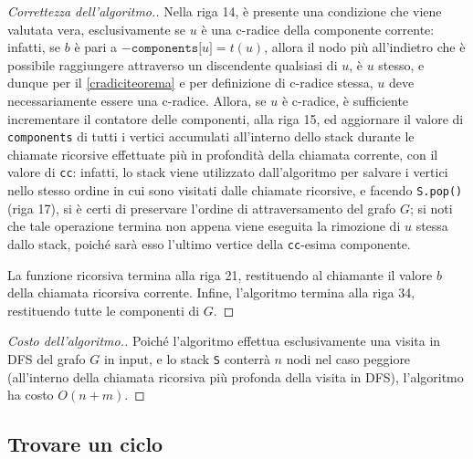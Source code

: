 \documentclass[a4paper, 12pt]{report}
\begin{document}
\begin{proof}[Correttezza dell'algoritmo.]
        Nella riga 14, è presente una condizione che viene valutata vera, esclusivamente se $u$ è una c-radice della componente corrente: infatti, se $b$ è pari a $-\texttt{components[}u\texttt{]} = t(u)$, allora il nodo più all'indietro che è possibile raggiungere attraverso un discendente qualsiasi di $u$, è $u$ stesso, e dunque per il \cref{cradiciteorema} e per definizione di c-radice stessa, $u$ deve necessariamente essere una c-radice. Allora, se $u$ è c-radice, è sufficiente incrementare il contatore delle componenti, alla riga 15, ed aggiornare il valore di \texttt{components} di tutti i vertici accumulati all'interno dello stack durante le chiamate ricorsive effettuate più in profondità della chiamata corrente, con il valore di \texttt{cc}: infatti, lo stack viene utilizzato dall'algoritmo per salvare i vertici nello stesso ordine in cui sono visitati dalle chiamate ricorsive, e facendo \texttt{S.pop()} (riga 17), si è certi di preservare l'ordine di attraversamento del grafo $G$; si noti che tale operazione termina non appena viene eseguita la rimozione di $u$ stessa dallo stack, poiché sarà esso l'ultimo vertice della \texttt{cc}-esima componente.

        La funzione ricorsiva termina alla riga 21, restituendo al chiamante il valore $b$ della chiamata ricorsiva corrente. Infine, l'algoritmo termina alla riga 34, restituendo tutte le componenti di $G$.
    \end{proof}

    \begin{proof}[Costo dell'algoritmo.]
        Poiché l'algoritmo effettua esclusivamente una visita in DFS del grafo $G$ in input, e lo stack \texttt{S} conterrà $n$ nodi nel caso peggiore (all'interno della chiamata ricorsiva più profonda della visita in DFS), l'algoritmo ha costo $O(n + m)$.
    \end{proof}

    \subsection{Trovare un ciclo}
\end{document}

